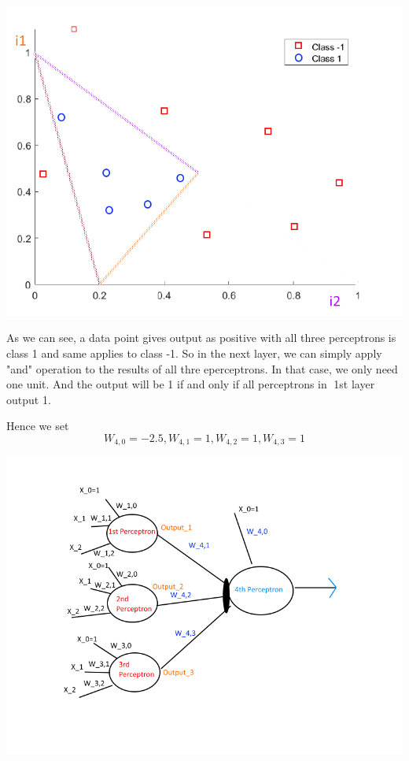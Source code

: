 \documentclass[12pt, letterpaper]{article}
\begin{document}
	\includegraphics[scale=0.6]{"problem-5b-1"}
	
	As we can see, a data point gives output as positive with all three perceptrons is class 1 and same applies to class -1.
	So in the next layer, we can simply apply "and" operation to the results of all thre eperceptrons. In that case, we only need one unit. And the output will be 1 if and only if all perceptrons in 1st layer output 1.
	
	Hence we set $$W_{4,0}=-2.5,W_{4,1}=1,W_{4,2}=1,W_{4,3}=1$$\newline
	
	\includegraphics[scale=0.6]{"problem-5b-2"}
	
	
	
	
\end{document}
